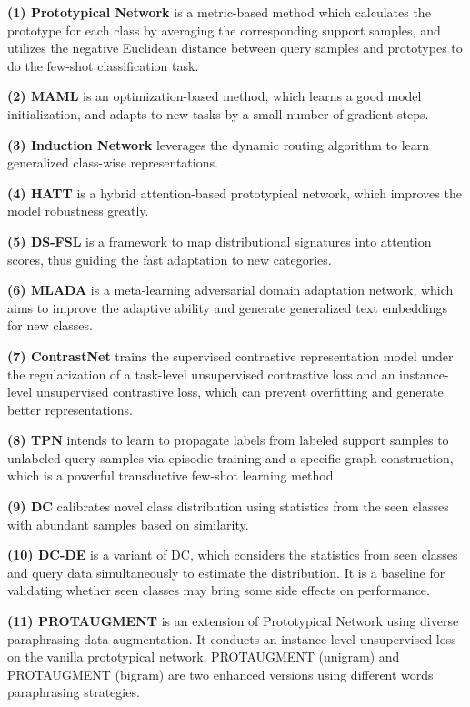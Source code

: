 \documentclass[letterpaper]{article} %
\begin{document}
\textbf{(1) Prototypical Network} \cite{snell2017prototypical} is a metric-based method which  calculates the prototype for
each class by averaging the corresponding support samples, and utilizes the negative Euclidean distance between query samples and prototypes to do the few-shot classification task.

\textbf{(2) MAML} \cite{finn2017model} is an optimization-based method, which learns a good model initialization, and adapts to new tasks by a small number of gradient steps.

\textbf{(3) Induction Network} \cite{DBLP:conf/emnlp/GengLLZJS19} leverages the dynamic routing algorithm to learn generalized class-wise representations.

\textbf{(4) HATT} \cite{DBLP:conf/aaai/GaoH0S19} is a hybrid attention-based prototypical network, which improves the model robustness greatly.

\textbf{(5) DS-FSL} \cite{iclr/BaoWCB20} is a framework to map distributional signatures into attention scores, thus guiding the fast adaptation to new categories.

\textbf{(6) MLADA} \cite{mlada} is a meta-learning adversarial domain adaptation network, which aims to improve the adaptive ability and generate generalized text embeddings for new classes.

\textbf{(7) ContrastNet} \cite{ContrastNet}  trains the supervised contrastive representation model
under the regularization of a task-level unsupervised contrastive loss and an instance-level unsupervised contrastive loss, which can prevent overfitting and generate better representations.

\textbf{(8) TPN} \cite{tpn} intends to learn to propagate labels from labeled support samples to unlabeled query samples via episodic training and a specific graph construction, which is a powerful transductive few-shot learning method.

\textbf{(9) DC} \cite{freelunch} calibrates novel class distribution using statistics from the seen classes with abundant samples based on similarity. 

\textbf{(10) DC-DE} is a variant of DC, which considers the statistics from seen classes and query data simultaneously to estimate the distribution. It is a baseline for validating whether seen classes may bring some side effects on performance.

\textbf{(11) PROTAUGMENT} \cite{ProtAugment} is an extension of Prototypical Network \cite{snell2017prototypical} using diverse paraphrasing data augmentation. It conducts an instance-level unsupervised loss on the vanilla prototypical network. PROTAUGMENT (unigram) and PROTAUGMENT (bigram) are two enhanced versions using different words paraphrasing strategies. 
\end{document}
